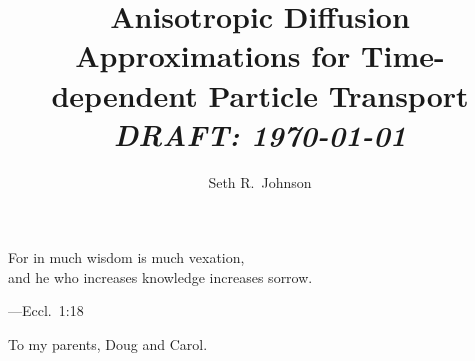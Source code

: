 \documentclass{umthesis}
\author{Seth R.~Johnson}
\title{Anisotropic Diffusion Approximations for Time-dependent Particle
Transport\texorpdfstring{\\%
  \emph{DRAFT: \today}}{}
}
\begin{document}
\allowdisplaybreaks
\setlength{\parskip}{0pt plus 0pt minus 0pt}

\frontmatter

\maketitle


\begin{frontispiece}
\begin{flushleft}
For in much wisdom is much vexation,\hfill\\
\hspace{1.5em}and he who increases knowledge increases sorrow.
\end{flushleft}
---Eccl.~1:18
\end{frontispiece}


\begin{dedication}
  To my parents, Doug and Carol.
\end{dedication}

\end{document}
